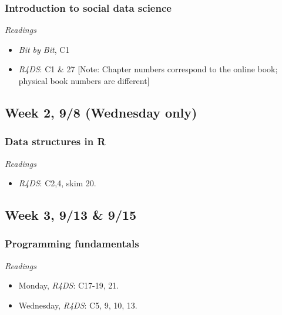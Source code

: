 \documentclass[
  10pt,
]{article}
\providecommand{\tightlist}{%
  \setlength{\itemsep}{0pt}\setlength{\parskip}{0pt}}
\begin{document}
\hypertarget{introduction-to-social-data-science}{%
\subsubsection{Introduction to social data
science}\label{introduction-to-social-data-science}}

\emph{Readings}

\begin{itemize}
\tightlist
\item
  \emph{Bit by Bit}, C1
\item
  \emph{R4DS}: C1 \& 27 {[}Note: Chapter numbers correspond to the
  online book; physical book numbers are different{]}
\end{itemize}

\hypertarget{week-2-98-wednesday-only}{%
\subsection{Week 2, 9/8 (Wednesday
only)}\label{week-2-98-wednesday-only}}

\hypertarget{data-structures-in-r}{%
\subsubsection{Data structures in R}\label{data-structures-in-r}}

\emph{Readings}

\begin{itemize}
\tightlist
\item
  \emph{R4DS}: C2,4, skim 20.
\end{itemize}

\hypertarget{week-3-913-915}{%
\subsection{Week 3, 9/13 \& 9/15}\label{week-3-913-915}}

\hypertarget{programming-fundamentals}{%
\subsubsection{Programming
fundamentals}\label{programming-fundamentals}}

\emph{Readings}

\begin{itemize}
\tightlist
\item
  Monday, \emph{R4DS}: C17-19, 21.
\item
  Wednesday, \emph{R4DS}: C5, 9, 10, 13.
\end{itemize}
\end{document}
